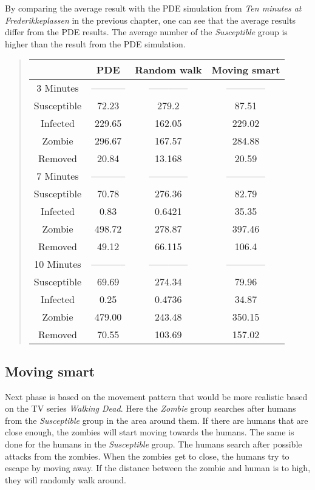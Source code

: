 \documentclass[%
twoside,                 %
final,                   %
chapterprefix=true,      %
open=right               %
10pt]{book}
\begin{document}
By comparing the average result with the PDE simulation from \emph{Ten minutes at Frederikkeplassen} in the previous chapter, one can see that the average results differ from the PDE results. The average number of the \emph{Susceptible} group is higher than the result from the PDE simulation. 

\label{table:frederikke_table_random}

\begin{quote}
\begin{tabular}{cccc}
\hline
\multicolumn{1}{c}{  } & \multicolumn{1}{c}{ PDE } & \multicolumn{1}{c}{ Random walk } & \multicolumn{1}{c}{ Moving smart } \\
\hline
3 Minutes   & ----------- & ------------ & ------------ \\
\hline
Susceptible & 72.23       & 279.2        & 87.51        \\
Infected    & 229.65      & 162.05       & 229.02       \\
Zombie      & 296.67      & 167.57       & 284.88       \\
Removed     & 20.84       & 13.168       & 20.59        \\
\hline
7 Minutes   & ----------- & ------------ & ------------ \\
\hline
Susceptible & 70.78       & 276.36       & 82.79        \\
Infected    & 0.83        & 0.6421       & 35.35        \\
Zombie      & 498.72      & 278.87       & 397.46       \\
Removed     & 49.12       & 66.115       & 106.4        \\
\hline
10 Minutes  & ----------- & ------------ & ------------ \\
\hline
Susceptible & 69.69       & 274.34       & 79.96        \\
Infected    & 0.25        & 0.4736       & 34.87        \\
Zombie      & 479.00      & 243.48       & 350.15       \\
Removed     & 70.55       & 103.69       & 157.02       \\
\hline
\end{tabular}
\end{quote}

\noindent



\subsection{Moving smart}
Next phase is based on the movement pattern that would be more realistic based on the TV series \emph{Walking Dead}. Here the \emph{Zombie} group searches after humans from the \emph{Susceptible} group in the area around them. If there are humans that are close enough, the zombies will start moving towards the humans. The same is done for the humans in the \emph{Susceptible} group. The humans search after possible attacks from the zombies. When the zombies get to close, the humans try to escape by moving away. If the distance between the zombie and human is to high, they will randomly walk around. 
\end{document}
